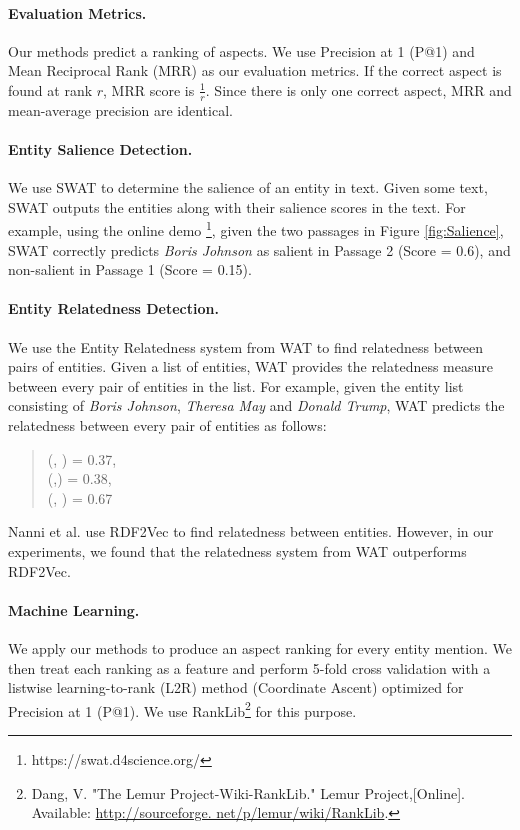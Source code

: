 \paragraph{\textbf{Evaluation Metrics.}}
Our methods predict a ranking of aspects. We use Precision at 1 (P@1) and Mean Reciprocal Rank (MRR) as our evaluation metrics. If the correct aspect is found at rank $r$, MRR score is $\frac{1}{r}$. Since there is only one correct aspect, MRR and mean-average precision are identical.


\paragraph{\textbf{Entity Salience Detection.}}
We use SWAT \cite{swat}  to determine the salience of an entity in text. Given some text, SWAT outputs the entities along with their salience scores in the text. For example, using the online demo \footnote{https://swat.d4science.org/}, given the two passages in Figure \ref{fig:Salience}, SWAT correctly predicts \textit{Boris Johnson} as salient in Passage 2 (Score = 0.6), and non-salient in Passage 1 (Score = 0.15). 

\paragraph{\textbf{Entity Relatedness Detection.}}
We use the Entity Relatedness system from WAT \cite{piccinno2014wat} to find relatedness between pairs of entities. Given a list of entities, WAT provides the relatedness measure between every pair of entities in the list. For example, given the entity list consisting of \textit{Boris Johnson}, \textit{Theresa May} and \textit{Donald Trump}, WAT predicts the relatedness between every pair of entities as follows:
\begin{quote}
    (, ) = 0.37, \\
    (,)    = 0.38, \\
    (, )  = 0.67
\end{quote}
Nanni et al. \cite{nanni2018entity} use RDF2Vec \cite{ristoski2016rdf2vec} to find relatedness between entities. However, in our experiments, we found that the relatedness system from WAT outperforms RDF2Vec.

\paragraph{\textbf{Machine Learning.}}
We apply our methods to produce an aspect ranking for every entity mention. We then treat each ranking as a feature and perform 5-fold cross validation with a listwise learning-to-rank (L2R) method (Coordinate Ascent) optimized for Precision at 1 (P@1). We use RankLib\footnote{Dang, V. "The Lemur Project-Wiki-RankLib." Lemur Project,[Online]. Available: \url{http://sourceforge. net/p/lemur/wiki/RankLib}.} for this purpose. 



